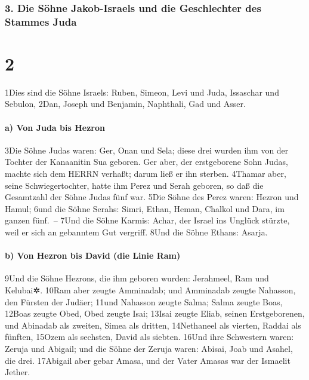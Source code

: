 \hypertarget{die-suxf6hne-jakob-israels-und-die-geschlechter-des-stammes-juda}{%
\subsubsection{3. Die Söhne Jakob-Israels und die Geschlechter des
Stammes
Juda}\label{die-suxf6hne-jakob-israels-und-die-geschlechter-des-stammes-juda}}

\hypertarget{section-1}{%
\section{2}\label{section-1}}

1Dies sind die Söhne Israels: Ruben, Simeon, Levi und Juda, Issaschar
und Sebulon, 2Dan, Joseph und Benjamin, Naphthali, Gad und Asser.

\hypertarget{a-von-juda-bis-hezron}{%
\paragraph{a) Von Juda bis Hezron}\label{a-von-juda-bis-hezron}}

3Die Söhne Judas waren: Ger, Onan und Sela; diese drei wurden ihm von
der Tochter der Kanaanitin Sua geboren. Ger aber, der erstgeborene Sohn
Judas, machte sich dem HERRN verhaßt; darum ließ er ihn sterben. 4Thamar
aber, seine Schwiegertochter, hatte ihm Perez und Serah geboren, so daß
die Gesamtzahl der Söhne Judas fünf war. 5Die Söhne des Perez waren:
Hezron und Hamul; 6und die Söhne Serahs: Simri, Ethan, Heman, Chalkol
und Dara, im ganzen fünf.~-- 7Und die Söhne Karmis: Achar, der Israel
ins Unglück stürzte, weil er sich an gebanntem Gut vergriff. 8Und die
Söhne Ethans: Asarja.

\hypertarget{b-von-hezron-bis-david-die-linie-ram}{%
\paragraph{b) Von Hezron bis David (die Linie
Ram)}\label{b-von-hezron-bis-david-die-linie-ram}}

9Und die Söhne Hezrons, die ihm geboren wurden: Jerahmeel, Ram und
Kelubai✲. 10Ram aber zeugte Amminadab; und Amminadab zeugte Nahasson,
den Fürsten der Judäer; 11und Nahasson zeugte Salma; Salma zeugte Boas,
12Boas zeugte Obed, Obed zeugte Isai; 13Isai zeugte Eliab, seinen
Erstgeborenen, und Abinadab als zweiten, Simea als dritten, 14Nethaneel
als vierten, Raddai als fünften, 15Ozem als sechsten, David als siebten.
16Und ihre Schwestern waren: Zeruja und Abigail; und die Söhne der
Zeruja waren: Abisai, Joab und Asahel, die drei. 17Abigail aber gebar
Amasa, und der Vater Amasas war der Ismaelit Jether.

